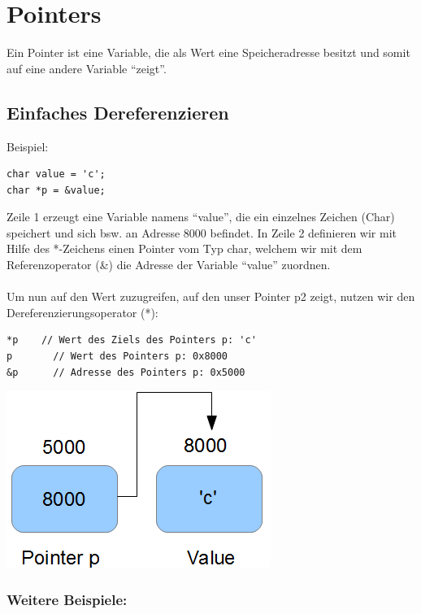 \documentclass[a4paper,10pt]{report}
\begin{document}
\section{Pointers}
Ein Pointer ist eine Variable, die als Wert eine Speicheradresse besitzt und somit auf eine andere Variable "`zeigt"'. 
\subsection{Einfaches Dereferenzieren}
Beispiel:\\
\begin{lstlisting}[]
char value = 'c';
char *p = &value;
\end{lstlisting}
Zeile 1 erzeugt eine Variable namens "`value"', die ein einzelnes Zeichen (Char) speichert und sich bsw. an Adresse 8000 befindet. In Zeile 2 definieren wir mit Hilfe des *-Zeichens einen Pointer vom Typ char, welchem wir mit dem Referenzoperator (\&) die Adresse der Variable "`value"' zuordnen.\\ \\
Um nun auf den Wert zuzugreifen, auf den unser Pointer p2 zeigt, nutzen wir den Dereferenzierungsoperator (*):\\
\begin{lstlisting}[]
*p    // Wert des Ziels des Pointers p: 'c'
p 		// Wert des Pointers p: 0x8000
&p 		// Adresse des Pointers p: 0x5000
\end{lstlisting}
\begin{center}\includegraphics[scale=0.6]{imgs/c-pointers.png}\end{center}

\subsubsection{Weitere Beispiele:}
\end{document}
